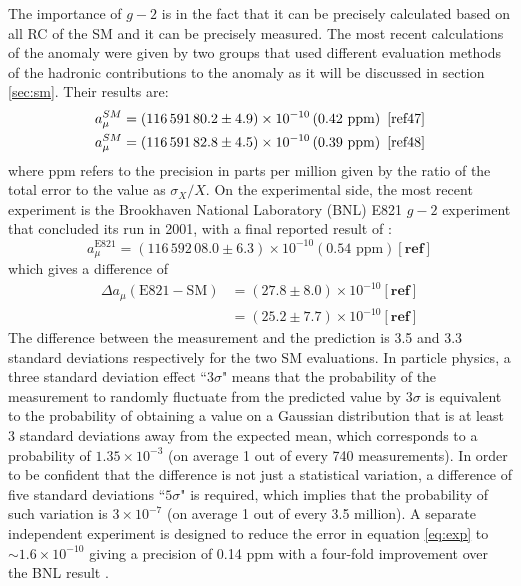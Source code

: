 \documentclass{outhesis}
\begin{document}
The importance of $g-2$ is in the fact that it can be precisely calculated based on all RC of the SM and it can be precisely measured. The most recent calculations of the anomaly were given by two groups that used different evaluation methods of the hadronic contributions to the anomaly as it will be discussed in section \ref{sec:sm}. Their results are:
\begin{equation}
\begin{split}
& a_{\mu}^{SM} = \left(116\, 591\, 80.2 \pm 4.9\right) \times 10^{-10} \left(0.42  \text{ ppm}\right)  \,\,\cite{ref47} \\
& a_{\mu}^{SM} = \left(116\, 591\, 82.8 \pm 4.5\right) \times 10^{-10} \left(0.39  \text{ ppm}\right)  \,\,\cite{ref48}
\end{split}
\end{equation}
where ppm refers to the precision in parts per million given by the ratio of the total error to the value as $\sigma_X/X$. 
On the experimental side, the most recent experiment is the Brookhaven National Laboratory (BNL) E821 $g-2$ experiment that concluded its run in 2001, with a final reported result of \cite{bnl}:
\begin{equation}
a_{\mu}^{\text{E821}} = \left(116\, 592\, 08.0 \pm 6.3\right) \times 10^{-10} \left(0.54  \text{ ppm}\right) [\textbf{ref}]
\label{eq:exp}
\end{equation}
which gives a difference of 
\begin{equation}
\begin{split}
\Delta a_{\mu} \left(\text{E821} - \text{SM} \right) & = \left(27.8 \pm 8.0\right) \times 10^{-10}  [\textbf{ref}]\\
 & = \left(25.2 \pm 7.7\right) \times 10^{-10}  [\textbf{ref}]
\label{eq:diff}
\end{split}
\end{equation}
The difference between the measurement and the prediction is 3.5 and 3.3 standard deviations respectively for the two SM evaluations. In particle physics, a three standard deviation effect ``$3\sigma$" means that the probability of the measurement to randomly fluctuate from the predicted value by $3\sigma$ is equivalent to the probability of obtaining a value on a Gaussian distribution that is at least 3 standard deviations away from the expected mean, which corresponds to a probability of $1.35 \times 10^{-3}$ (on average 1 out of every 740 measurements). In order to be confident that the difference is not just a statistical variation, a difference of five standard deviations ``$5\sigma$" is required, which implies that the probability of such variation is $3 \times 10^{-7}$ (on average 1 out of every 3.5 million).  A separate independent experiment is designed to reduce the error in equation \ref{eq:exp} to $\sim 1.6 \times 10^{-10}$ giving a precision of 0.14 ppm with a four-fold improvement over the BNL result \cite{bnl}.
\end{document}
